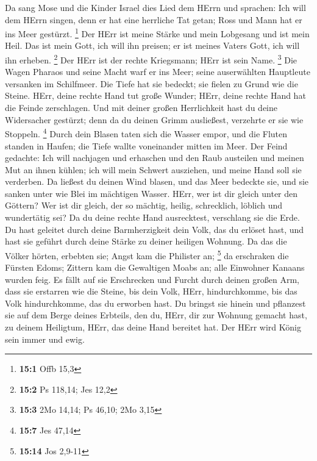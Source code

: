 Da sang Mose und die Kinder Israel dies Lied dem HErrn und
sprachen: Ich will dem HErrn singen, denn er hat eine herrliche Tat
getan; Ross und Mann hat er ins Meer gestürzt. \footnote{\textbf{15:1}
  Offb 15,3}  Der HErr ist meine Stärke und mein Lobgesang
und ist mein Heil. Das ist mein Gott, ich will ihn preisen; er ist
meines Vaters Gott, ich will ihn erheben. \footnote{\textbf{15:2} Ps
  118,14; Jes 12,2}  Der HErr ist der rechte Kriegsmann;
HErr ist sein Name. \footnote{\textbf{15:3} 2Mo 14,14; Ps 46,10; 2Mo
  3,15}  Die Wagen Pharaos und seine Macht warf er ins Meer;
seine auserwählten Hauptleute versanken im Schilfmeer.  Die
Tiefe hat sie bedeckt; sie fielen zu Grund wie die Steine. 
HErr, deine rechte Hand tut große Wunder; HErr, deine rechte Hand hat
die Feinde zerschlagen.  Und mit deiner großen Herrlichkeit
hast du deine Widersacher gestürzt; denn da du deinen Grimm ausließest,
verzehrte er sie wie Stoppeln. \footnote{\textbf{15:7} Jes 47,14}
 Durch dein Blasen taten sich die Wasser empor, und die
Fluten standen in Haufen; die Tiefe wallte voneinander mitten im Meer.
 Der Feind gedachte: Ich will nachjagen und erhaschen und
den Raub austeilen und meinen Mut an ihnen kühlen; ich will mein Schwert
ausziehen, und meine Hand soll sie verderben.  Da ließest
du deinen Wind blasen, und das Meer bedeckte sie, und sie sanken unter
wie Blei im mächtigen Wasser.  HErr, wer ist dir gleich
unter den Göttern? Wer ist dir gleich, der so mächtig, heilig,
schrecklich, löblich und wundertätig sei?  Da du deine
rechte Hand ausrecktest, verschlang sie die Erde.  Du hast
geleitet durch deine Barmherzigkeit dein Volk, das du erlöset hast, und
hast sie geführt durch deine Stärke zu deiner heiligen Wohnung.
 Da das die Völker hörten, erbebten sie; Angst kam die
Philister an; \footnote{\textbf{15:14} Jos 2,9-11}  da
erschraken die Fürsten Edoms; Zittern kam die Gewaltigen Moabs an; alle
Einwohner Kanaans wurden feig.  Es fällt auf sie
Erschrecken und Furcht durch deinen großen Arm, dass sie erstarren wie
die Steine, bis dein Volk, HErr, hindurchkomme, bis das Volk
hindurchkomme, das du erworben hast.  Du bringst sie hinein
und pflanzest sie auf dem Berge deines Erbteils, den du, HErr, dir zur
Wohnung gemacht hast, zu deinem Heiligtum, HErr, das deine Hand bereitet
hat.  Der HErr wird König sein immer und ewig.

